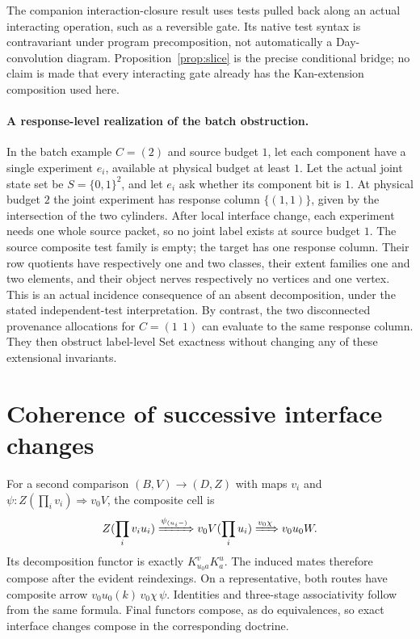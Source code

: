 \documentclass[11pt]{article}
\theoremstyle{definition}\newtheorem{definition}[theorem]{Definition}
\theoremstyle{remark}\newtheorem{remark}[theorem]{Remark}
\begin{document}
The companion interaction-closure result uses tests pulled back along an
actual interacting operation, such as a reversible gate. Its native test
syntax is contravariant under program precomposition, not automatically a
Day-convolution diagram. Proposition~\ref{prop:slice} is the precise
conditional bridge; no claim is made that every interacting gate already
has the Kan-extension composition used here.


\paragraph{A response-level realization of the batch obstruction.}
In the batch example $C=(2)$ and source budget $1$, let each component
have a single experiment $e_i$, available at physical budget at least $1$.
Let the actual joint state set be $S=\{0,1\}^2$, and let $e_i$ ask
whether its component bit is $1$. At physical budget $2$ the joint
experiment has response column $\{(1,1)\}$, given by the intersection
of the two cylinders. After local interface change, each experiment needs
one whole source packet, so no joint label exists at source budget $1$.
The source composite test family is empty; the target has one response
column. Their row quotients have respectively one and two classes, their
extent families one and two elements, and their object nerves respectively
no vertices and one vertex. This is an actual incidence consequence of
an absent decomposition, under the stated independent-test interpretation.
By contrast, the two disconnected provenance allocations for $C=(1\ \ 1)$
can evaluate to the same response column. They then obstruct label-level
Set exactness without changing any of these extensional invariants.

\section{Coherence of successive interface changes}
For a second comparison $(B,V)\to(D,Z)$ with maps $v_i$ and
$\psi:Z(\prod_i v_i)\Rightarrow v_0V$, the composite cell is
\[
 Z(\prod_i v_i u_i)
  \xRightarrow{\psi_{(u_i-)}}v_0V(\prod_i u_i)
  \xRightarrow{v_0\chi}v_0u_0W.
\]
Its decomposition functor is exactly
$K^v_{u_0a}K^u_a$. The induced mates therefore compose after the evident
reindexings. On a representative, both routes have composite arrow
$v_0u_0(k)\,v_0\chi\,\psi$. Identities and three-stage associativity
follow from the same formula. Final functors compose, as do equivalences,
so exact interface changes compose in the corresponding doctrine.
\end{document}
